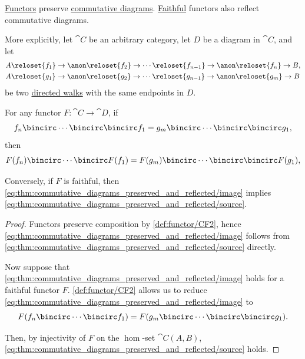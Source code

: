 \begin{proposition}\label{thm:commutative_diagrams_preserved_and_reflected}
  \hyperref[def:functor]{Functors} preserve \hyperref[def:categorical_diagram/commutative]{commutative diagrams}. \hyperref[def:functor_invertibility/faithful]{Faithful} functors also reflect commutative diagrams.

  More explicitly, let \( \cat{C} \) be an arbitrary category, let \( D \) be a diagram in \( \cat{C} \), and let
  \begin{align*}
    &A \reloset {f_1} \to \anon \reloset {f_2} \to \cdots \reloset {f_{n-1}} \to \anon \reloset {f_n} \to B, \\
    &A \reloset {g_1} \to \anon \reloset {g_2} \to \cdots \reloset {g_{n-1}} \to \anon \reloset {g_m} \to B
  \end{align*}
  be two \hyperref[def:graph_walk/directed]{directed walks} with the same endpoints in \( D \).

  For any functor \( F: \cat{C} \to \cat{D} \), if
  \begin{equation}\label{eq:thm:commutative_diagrams_preserved_and_reflected/source}
    f_n \bincirc \cdots \bincirc \bincirc f_1 = g_m \bincirc \cdots \bincirc \bincirc g_1,
  \end{equation}
  then
  \begin{equation}\label{eq:thm:commutative_diagrams_preserved_and_reflected/image}
    F(f_n) \bincirc \cdots \bincirc F(f_1) = F(g_m) \bincirc \cdots \bincirc \bincirc F(g_1),
  \end{equation}

  Conversely, if \( F \) is faithful, then \eqref{eq:thm:commutative_diagrams_preserved_and_reflected/image} implies \eqref{eq:thm:commutative_diagrams_preserved_and_reflected/source}.
\end{proposition}
\begin{proof}
  Functors preserve composition by \ref{def:functor/CF2}, hence \eqref{eq:thm:commutative_diagrams_preserved_and_reflected/image} follows from \eqref{eq:thm:commutative_diagrams_preserved_and_reflected/source} directly.

  Now suppose that \eqref{eq:thm:commutative_diagrams_preserved_and_reflected/image} holds for a faithful functor \( F \). \ref{def:functor/CF2} allows us to reduce \eqref{eq:thm:commutative_diagrams_preserved_and_reflected/image} to
  \begin{equation*}
    F(f_n \bincirc \cdots \bincirc f_1) = F(g_m \bincirc \cdots \bincirc \bincirc g_1).
  \end{equation*}

  Then, by injectivity of \( F \) on the \( \hom \)-set \( \cat{C}(A, B) \), \eqref{eq:thm:commutative_diagrams_preserved_and_reflected/source} holds.
\end{proof}


